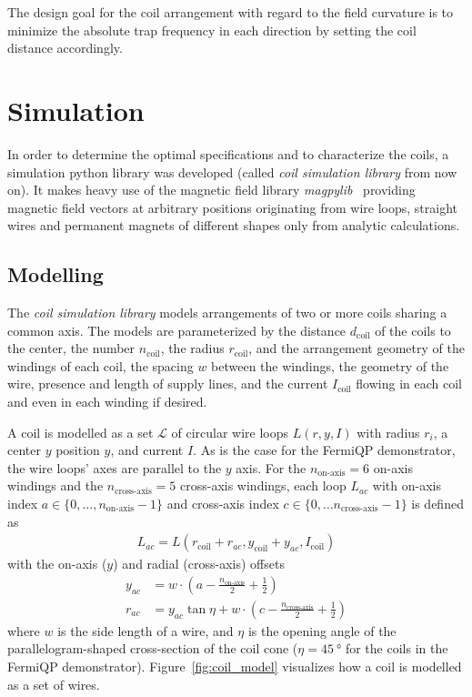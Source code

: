 The design goal for the coil arrangement with regard to the field curvature is to minimize the absolute trap frequency in each direction by setting the coil distance accordingly.

\section{Simulation}\label{ch:simulation}
In order to determine the optimal specifications and to characterize the coils, a simulation python library was developed (called \textit{coil simulation library} from now on). It makes heavy use of the magnetic field library \textit{magpylib}~\cite{ortner_magpylib_2020, noauthor_magpylibmagpylib_2022} providing magnetic field vectors at arbitrary positions originating from wire loops, straight wires and permanent magnets of different shapes only from analytic calculations.

\subsection*{Modelling}
The \textit{coil simulation library} models arrangements of two or more coils sharing a common axis. The models are parameterized by the distance $d_\text{coil}$ of the coils to the center, the number $n_\text{coil}$, the radius $r_\text{coil}$, and the arrangement geometry of the windings of each coil, the spacing $w$ between the windings, the geometry of the wire, presence and length of supply lines, and the current $I_\text{coil}$ flowing in each coil and even in each winding if desired.

A coil is modelled as a set $\mathcal{L}$ of circular wire loops $L(r, y, I)$ with radius $r_i$, a center $y$ position $y$, and current $I$. As is the case for the FermiQP demonstrator, the wire loops' axes are parallel to the $y$ axis. For the $n_\text{on-axis} = 6$ on-axis windings and the $n_\text{cross-axis} = 5$ cross-axis windings, each loop $L_{ac}$ with on-axis index $a \in \{0, \ldots, n_\text{on-axis} - 1\}$ and cross-axis index $c \in \{0, \ldots n_\text{cross-axis} - 1\}$ is defined as
\begin{align}
    L_{ac} = L \left(r_\text{coil} + r_{ac}, y_\text{coil} + y_{ac}, I_\text{coil}\right)
\end{align}
with the on-axis ($y$) and radial (cross-axis) offsets
\begin{align}
    y_{ac} &= w\cdot \left(a-\frac{n_\text{on-axis}}{2} + \frac{1}{2}\right) \\
    r_{ac} &= y_{ac} \tan \eta + w \cdot \left(c - \frac{n_\text{cross-axis}}{2} + \frac{1}{2}\right)
\end{align}
where $w$ is the side length of a wire, and $\eta$ is the opening angle of the parallelogram-shaped cross-section of the coil cone ($\eta = \SI{45}{\degree}$ for the coils in the FermiQP demonstrator). Figure~\ref{fig:coil_model} visualizes how a coil is modelled as a set of wires.

